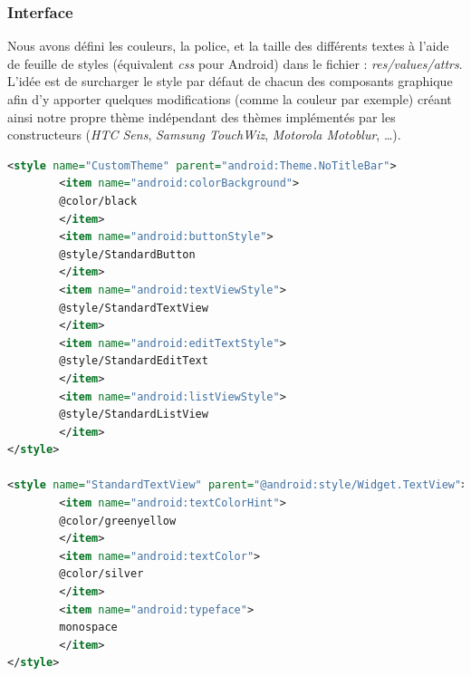 \subsubsection{Interface}
Nous avons défini les couleurs, la police, et la taille des différents textes à
l'aide de feuille de styles (équivalent \textit{css} pour Android) dans le
fichier : \textit{res/values/attrs}. L'idée est de surcharger le style par
défaut de chacun des composants graphique afin d'y apporter quelques
modifications (comme la couleur par exemple) créant ainsi notre propre thème
indépendant des thèmes implémentés par les constructeurs (\textit{HTC Sens},
\textit{Samsung TouchWiz}, \textit{Motorola Motoblur}, \ldots).
\begin{lstlisting}[language=XML, format=XML]
<style name="CustomTheme" parent="android:Theme.NoTitleBar">
		<item name="android:colorBackground">
		@color/black
		</item>
		<item name="android:buttonStyle">
		@style/StandardButton
		</item>
		<item name="android:textViewStyle">
		@style/StandardTextView
		</item>
		<item name="android:editTextStyle">
		@style/StandardEditText
		</item>
		<item name="android:listViewStyle">
		@style/StandardListView
		</item>
</style>

<style name="StandardTextView" parent="@android:style/Widget.TextView">
		<item name="android:textColorHint">
		@color/greenyellow
		</item>
		<item name="android:textColor">
		@color/silver
		</item>
		<item name="android:typeface">
		monospace
		</item>
</style>
\end{lstlisting}

